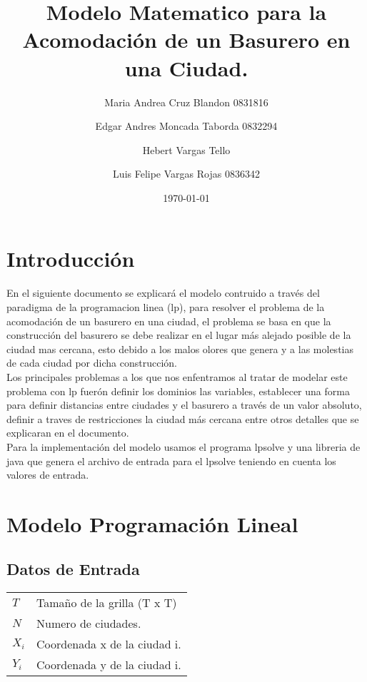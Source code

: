 \documentclass[10pt]{article}
\title{ \textbf{Modelo Matematico para la Acomodación de un Basurero en una Ciudad.}}
\author{Maria Andrea Cruz Blandon 0831816 \and Edgar Andres Moncada  Taborda 0832294 \and Hebert Vargas Tello \and Luis Felipe Vargas Rojas 0836342  }
\date{\today}
\begin{document}
\maketitle

\tableofcontents

\section{Introducci\'on}
En el siguiente documento se explicará el modelo contruido a través del paradigma de la programacion linea (lp), para resolver el problema de la acomodación de un basurero en una ciudad, el problema se basa en que la construcci\'on del basurero se debe realizar en el lugar  m\'as alejado posible de la ciudad mas cercana, esto debido a los malos olores que genera y a las molestias de cada ciudad por dicha construcción.\\

Los principales problemas a los que nos enfentramos al tratar de modelar este problema con lp fuer\'on  definir los dominios las variables, establecer una forma para definir distancias entre ciudades y el basurero a trav\'es de un valor absoluto, definir a traves de restricciones la ciudad m\'as cercana entre otros detalles que se explicaran en el documento.\\

Para la implementación del modelo usamos el programa lpsolve y una libreria de java que genera el archivo de entrada para el lpsolve teniendo en cuenta los valores de entrada.

\section{Modelo Programaci\'on Lineal} 

\subsection{Datos de Entrada}
\begin{tabular}{l l }
$T$ & Tamaño de la grilla (T x T)\\
$N$ & Numero de ciudades.\\ 
$X_i$ & Coordenada x de la ciudad i. \\
$Y_i$ & Coordenada y de la ciudad i. \\

\end{tabular}
\end{document}
